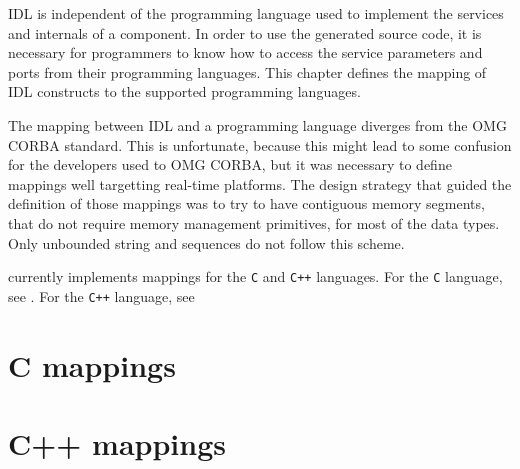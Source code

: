 %
%
%
%
%

\GenoM{} IDL is  independent of the programming language  used to implement the
services and internals  of a component. In order to  use the \GenoM{} generated
source code, it is necessary for  programmers to know how to access the service
parameters and ports from their programming languages. This chapter defines the
mapping of \GenoM{} IDL constructs to the supported programming languages.

The mapping between  \GenoM{} IDL and a programming  language diverges from the
OMG  CORBA standard.   This is  unfortunate, because  this might  lead  to some
confusion for the developers used to  OMG CORBA, but it was necessary to define
mappings well  targetting real-time platforms. The design  strategy that guided
the definition of those mappings was to try to have contiguous memory segments,
that do not  require memory management primitives, for most  of the data types.
Only unbounded string and sequences do not follow this scheme.

\GenoM{}  currently  implements  mappings  for   the  {\tt  C}  and  {\tt  C++}
languages.        For       the        {\tt       C}        language,       see
. For the {\tt C++}
language, see 

\section{C mappings}
\label{sec:mappings:c}


\section{C++ mappings}
\label{sec:mappings:cxx}

